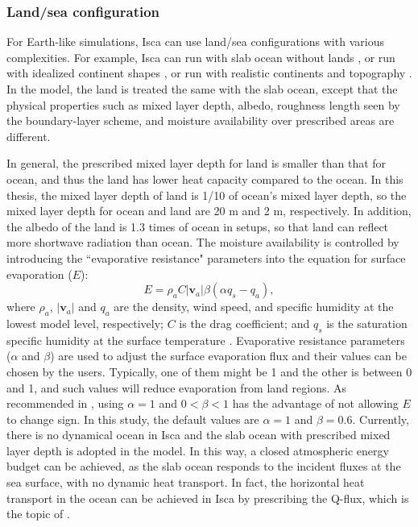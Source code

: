 
\subsubsection{Land/sea configuration}

For Earth-like simulations, Isca can use land/sea configurations with various complexities. For example, Isca can run with slab ocean without lands \citep[aquaplanet setup; e.g.,][]{Geen2018regime,Geen2019processes}, or run with idealized continent shapes \citep[e.g.,][]{Pietschnig2019}, or run with realistic continents and topography \citep[e.g.,][]{Geen2018regime}. In the model, the land is treated the same with the slab ocean, except that the physical properties such as mixed layer depth, albedo, roughness length seen by the boundary-layer scheme, and moisture availability over prescribed areas are different.

In general, the prescribed mixed layer depth for land is smaller than  that for ocean, and thus the land has lower heat capacity compared to the ocean. In this thesis, the mixed layer depth of land is 1/10 of ocean's mixed layer depth, so the mixed layer depth for ocean and land are 20 m and 2 m, respectively. In addition, the albedo of the land is 1.3 times of ocean in setups, so that land can reflect more shortwave radiation than ocean. The moisture availability is controlled by introducing the ``evaporative resistance" parameters into the equation for surface evaporation ($E$):
\begin{equation}
    E = \rho_a C|\mathbf{v}_a|\beta(\alpha q_s - q_a),
\end{equation}
where $\rho_a$, $|\mathbf{v}_a|$ and $q_a$ are the density, wind speed, and specific humidity at the lowest model level, respectively; $C$ is the drag coefficient; and $q_s$ is the saturation specific humidity at the surface temperature \citep{Frierson2006}. Evaporative resistance parameters ($\alpha$ and $\beta$) are used to adjust the surface evaporation flux and their values can be chosen by the users. Typically, one of them might be 1 and the other is between 0 and 1, and such values will reduce evaporation from land regions. As recommended in \cite{Vallis2018}, using $\alpha=1$ and $0<\beta<1$ has the advantage of not allowing $E$ to change sign. In this study, the default values are $\alpha=1$ and $\beta=0.6$. Currently, there is no dynamical ocean in Isca and the slab ocean with prescribed mixed layer depth is adopted in the model. In this way, a closed atmospheric energy budget can be achieved, as the slab ocean responds to the incident fluxes at the sea surface, with no dynamic heat transport. In fact, the horizontal heat transport in the ocean can be achieved in Isca by prescribing the Q-flux, which is the topic of .

